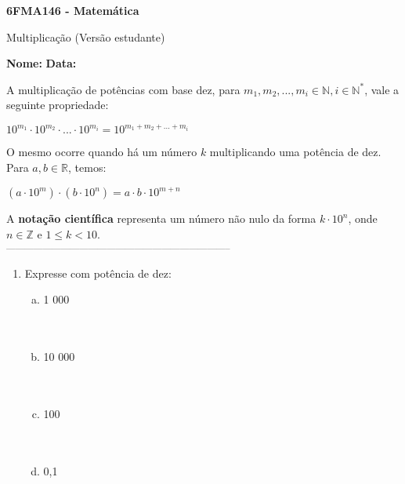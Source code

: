 \documentclass[a4paper,14pt]{article}
\begin{document}
	
	\noindent\textbf{6FMA146 - Matemática} 
	
	\begin{center}Multiplicação (Versão estudante)
	\end{center}
	
	\noindent\textbf{Nome:} \underline{\hspace{10cm}}
	\noindent\textbf{Data:} \underline{\hspace{4cm}}
	
	
	\begin{multicols}{2}
	    \noindent A multiplicação de potências com base dez, para $m_1, m_2, ..., m_i \in \mathbb{N}, i \in \mathbb{N}^*$, vale a seguinte propriedade: \\
	    \begin{center} $10^{m_1} \cdot 10^{m_2} \cdot ... \cdot 10^{m_i} = 10^{m_1 + m_2 + ... + m_i}$ 
	    \end{center}
	    O mesmo ocorre quando há um número $k$ multiplicando uma potência de dez. Para $a, b \in \mathbb{R}$, temos: \\
	    \begin{center} $(a \cdot 10^m) \cdot (b \cdot 10^n) = a \cdot b \cdot 10^{m + n}$ 
	    \end{center}
	    A \textbf{notação científica} representa um número não nulo da forma $k \cdot 10^n$, onde $n \in \mathbb{Z}$ e $1 \leq k < 10$. \\
		\noindent\textsubscript{--------------------------------------------------------------------------}
		\begin{enumerate} 
			\item Expresse com potência de dez:
			\begin{enumerate}[a)]
				\item 1 000 \\\\\\
				\item 10 000 \\\\\\
				\item 100 \\\\\\
				\item 0,1 \\\\\\

\end{enumerate}
\end{enumerate}
\end{multicols}
\end{document}
